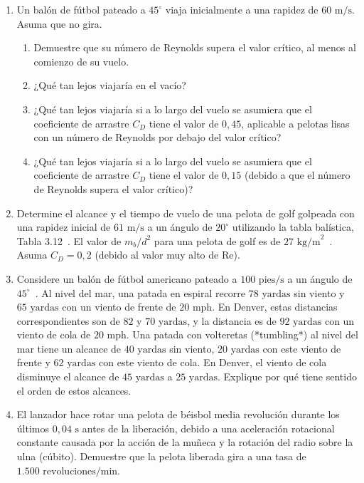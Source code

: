 \documentclass[12pt]{book}
\begin{document}
\begin{enumerate}
\item[3.105] Un balón de fútbol pateado a $45^\circ$ viaja inicialmente a una rapidez de $60\text{ m/s}$. Asuma que no gira.
\begin{enumerate}
\item[(a)] Demuestre que su número de Reynolds supera el valor crítico, al menos al comienzo de su vuelo.
\item[(b)] ¿Qué tan lejos viajaría en el vacío?
\item[(c)] ¿Qué tan lejos viajaría si a lo largo del vuelo se asumiera que el coeficiente de arrastre $C_D$ tiene el valor de $0{,}45$, aplicable a pelotas lisas con un número de Reynolds por debajo del valor crítico?
\item[(d)] ¿Qué tan lejos viajaría si a lo largo del vuelo se asumiera que el coeficiente de arrastre $C_D$ tiene el valor de $0{,}15$ (debido a que el número de Reynolds supera el valor crítico)?
\end{enumerate}

\item[3.106] Determine el alcance y el tiempo de vuelo de una pelota de golf golpeada con una rapidez inicial de $61\text{ m/s}$ a un ángulo de $20^\circ$ utilizando la tabla balística, Tabla 3.12~\cite{ref37}. El valor de $m_b/d^2$ para una pelota de golf es de $27\text{ kg/m}^2$~\cite{ref37}. Asuma $C_D = 0{,}2$ (debido al valor muy alto de $\text{Re}$).

\item[3.107] Considere un balón de fútbol americano pateado a $100\text{ pies/s}$ a un ángulo de $45^\circ$~\cite{ref57}. Al nivel del mar, una patada en espiral recorre $78\text{ yardas}$ sin viento y $65\text{ yardas}$ con un viento de frente de $20\text{ mph}$. En Denver, estas distancias correspondientes son de $82$ y $70\text{ yardas}$, y la distancia es de $92\text{ yardas}$ con un viento de cola de $20\text{ mph}$. Una patada con volteretas (*tumbling*) al nivel del mar tiene un alcance de $40\text{ yardas}$ sin viento, $20\text{ yardas}$ con este viento de frente y $62\text{ yardas}$ con este viento de cola. En Denver, el viento de cola disminuye el alcance de $45\text{ yardas}$ a $25\text{ yardas}$. Explique por qué tiene sentido el orden de estos alcances.

\item[3.108] El lanzador hace rotar una pelota de béisbol media revolución durante los últimos $0{,}04\text{ s}$ antes de la liberación, debido a una aceleración rotacional constante causada por la acción de la muñeca y la rotación del radio sobre la ulna (cúbito). Demuestre que la pelota liberada gira a una tasa de $1.500\text{ revoluciones/min}$.


\end{enumerate}
\end{document}
